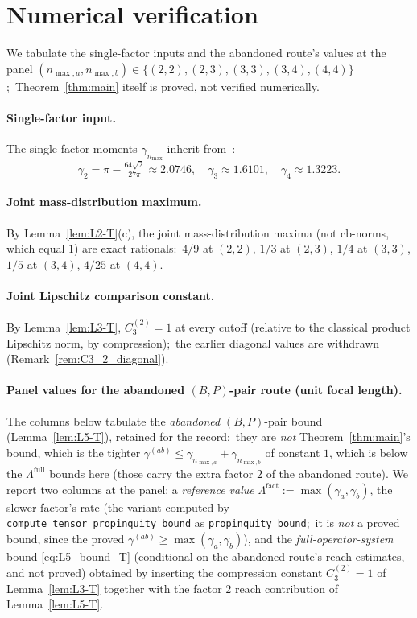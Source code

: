 \documentclass[11pt,a4paper]{article}
\theoremstyle{plain}
\theoremstyle{definition}
\newcommand{\nmax}{n_{\max}}
\newcommand{\nmaxa}{n_{\max,a}}
\newcommand{\nmaxb}{n_{\max,b}}
\begin{document}
\section{Numerical verification}\label{sec:numerical}

We tabulate the single-factor inputs and the abandoned route's values at
the panel $(\nmaxa, \nmaxb) \in \{(2,2), (2,3), (3,3), (3,4), (4,4)\}$;\
Theorem~\ref{thm:main} itself is proved, not verified numerically.

\paragraph{Single-factor input.} The single-factor moments
$\gamma_{\nmax}$ inherit from~\cite[Lemma~3.4]{loutey_paper38}:
\[
   \gamma_2 = \pi - \tfrac{64\sqrt{2}}{27\pi} \approx 2.0746, \quad
   \gamma_3 \approx 1.6101, \quad
   \gamma_4 \approx 1.3223.
\]

\paragraph{Joint mass-distribution maximum.} By
Lemma~\ref{lem:L2-T}(c), the joint mass-distribution maxima (not
cb-norms, which equal $1$) are exact rationals:\
$4/9$ at $(2,2)$, $1/3$ at $(2,3)$, $1/4$ at $(3,3)$, $1/5$ at
$(3,4)$, $4/25$ at $(4,4)$.

\paragraph{Joint Lipschitz comparison constant.} By
Lemma~\ref{lem:L3-T}, $C_3^{(2)} = 1$ at every cutoff (relative to the
classical product Lipschitz norm, by compression);\ the earlier diagonal
values are withdrawn (Remark~\ref{rem:C3_2_diagonal}).

\paragraph{Panel values for the abandoned $(B,P)$-pair route (unit focal
length).}
The columns below tabulate the \emph{abandoned} $(B,P)$-pair bound
(Lemma~\ref{lem:L5-T}), retained for the record;\ they are \emph{not}
Theorem~\ref{thm:main}'s bound, which is the tighter
$\gamma^{(ab)} \le \gamma_{\nmaxa}+\gamma_{\nmaxb}$ of constant $1$,
which is below the $\Lambda^{\mathrm{full}}$ bounds here (those
carry the extra factor $2$ of the abandoned route).
We report two columns at the panel: a \emph{reference value}
$\Lambda^{\mathrm{fact}} := \max(\gamma_a, \gamma_b)$, the slower factor's
rate (the variant computed by \texttt{compute\_tensor\_propinquity\_bound}
as \texttt{propinquity\_bound};\ it is \emph{not} a proved bound, since the
proved $\gamma^{(ab)} \ge \max(\gamma_a, \gamma_b)$), and the
\emph{full-operator-system} bound
\eqref{eq:L5_bound_T} (conditional on the abandoned route's reach
estimates, and not proved) obtained by inserting the compression constant
$C_3^{(2)} = 1$ of Lemma~\ref{lem:L3-T} together with the
factor $2$ reach contribution of Lemma~\ref{lem:L5-T}.
\end{document}
